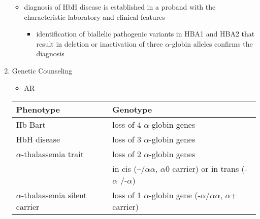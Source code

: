 \documentclass[12pt]{scrartcl}
\begin{document}
\begin{enumerate}
\begin{itemize}
\begin{itemize}
\end{itemize}
\item diagnosis of HbH disease is established in a proband with the
characteristic laboratory and clinical features
\begin{itemize}
\item identification of biallelic pathogenic variants in HBA1 and HBA2
that result in deletion or inactivation of three \(\alpha\)-globin
alleles confirms the diagnosis
\end{itemize}
\end{itemize}
\item Genetic Counseling
\label{sec:orgfa88ca9}
\begin{itemize}
\item AR
\end{itemize}

\begin{center}
\begin{tabular}{ll}
Phenotype & Genotype\\
\hline
Hb Bart & loss of 4 \(\alpha\)-globin genes\\
HbH disease & loss of 3 \(\alpha\)-globin genes\\
\(\alpha\)-thalassemia trait & loss of 2 \(\alpha\)-globin genes\\
 & in cis (--/\(\alpha \alpha\), \(\alpha\)0 carrier) or in trans (-\(\alpha\) /-\(\alpha\))\\
\(\alpha\)-thalassemia silent carrier & loss of 1 \(\alpha\)-globin gene (-\(\alpha\)/\(\alpha \alpha\), \(\alpha\)+ carrier)\\
\end{tabular}
\end{center}
\end{enumerate}
\end{document}
